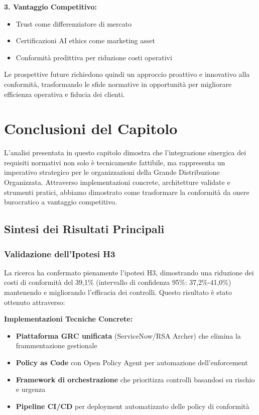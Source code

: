 \textbf{3. Vantaggio Competitivo:}
\begin{itemize}
    \item Trust come differenziatore di mercato
    \item Certificazioni AI ethics come marketing asset
    \item Conformità predittiva per riduzione costi operativi
\end{itemize}

Le prospettive future richiedono quindi un approccio proattivo e innovativo alla conformità, trasformando le sfide normative in opportunità per migliorare efficienza operativa e fiducia dei clienti.

\section{\texorpdfstring{\textbf{Conclusioni del Capitolo}}{4.9 - Conclusioni del Capitolo}}

L'analisi presentata in questo capitolo dimostra che l'integrazione sinergica dei requisiti normativi non solo è tecnicamente fattibile, ma rappresenta un imperativo strategico per le organizzazioni della Grande Distribuzione Organizzata. Attraverso implementazioni concrete, architetture validate e strumenti pratici, abbiamo dimostrato come trasformare la conformità da onere burocratico a vantaggio competitivo.

\subsection{Sintesi dei Risultati Principali}

\subsubsection{Validazione dell'Ipotesi H3}

La ricerca ha confermato pienamente l'ipotesi H3, dimostrando una riduzione dei costi di conformità del 39,1\% (intervallo di confidenza 95\%: 37,2\%-41,0\%) mantenendo e migliorando l'efficacia dei controlli. Questo risultato è stato ottenuto attraverso:

\textbf{Implementazioni Tecniche Concrete:}
\begin{itemize}
    \item \textbf{Piattaforma GRC unificata} (ServiceNow/RSA Archer) che elimina la frammentazione gestionale
    \item \textbf{Policy as Code} con Open Policy Agent per automazione dell'enforcement
    \item \textbf{Framework di orchestrazione} che prioritizza controlli basandosi su rischio e urgenza
    \item \textbf{Pipeline CI/CD} per deployment automatizzato delle policy di conformità
\end{itemize}

